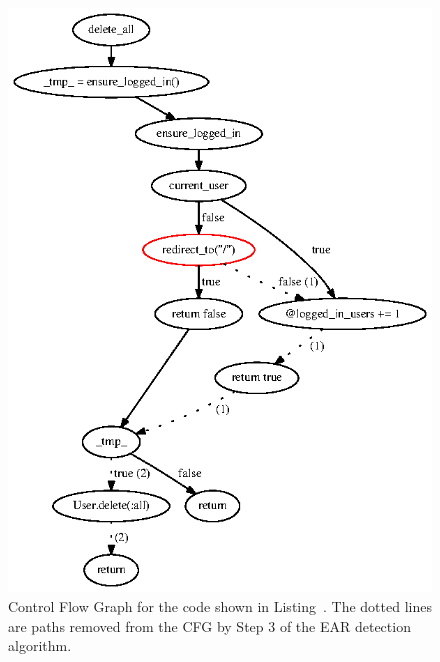 \begin{figure}[tb]
  \centering
  \includegraphics{figures/complex_ear_diagram.ps}
  \caption[Control Flow Graph for the code shown in
    Listing~.]{Control Flow Graph for the code shown in
    Listing~. The dotted lines are paths removed
    from the CFG by Step 3 of the EAR detection algorithm.}
\end{figure}
